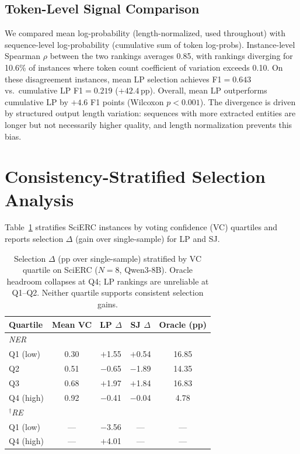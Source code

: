 \subsection{Token-Level Signal Comparison}\label{app:token_signal}

We compared mean log-probability (length-normalized, used throughout) with sequence-level log-probability (cumulative sum of token log-probs).
Instance-level Spearman $\rho$ between the two rankings averages 0.85, with rankings diverging for 10.6\% of instances where token count coefficient of variation exceeds 0.10.
On these disagreement instances, mean LP selection achieves F1${=}0.643$ vs.\ cumulative LP F1${=}0.219$ ($+42.4$\,pp).
Overall, mean LP outperforms cumulative LP by $+4.6$ F1 points (Wilcoxon $p{<}0.001$).
The divergence is driven by structured output length variation: sequences with more extracted entities are longer but not necessarily higher quality, and length normalization prevents this bias.

\section{Consistency-Stratified Selection Analysis}\label{app:vc_quartile}

Table~\ref{tab:vc_quartile} stratifies SciERC instances by voting confidence (VC) quartiles and reports selection $\Delta$ (gain over single-sample) for LP and SJ.

\begin{table}[t]
\centering
\small
\caption{Selection $\Delta$ (pp over single-sample) stratified by VC quartile on SciERC ($N{=}8$, Qwen3-8B). Oracle headroom collapses at Q4; LP rankings are unreliable at Q1--Q2. Neither quartile supports consistent selection gains.}
\label{tab:vc_quartile}
\begin{tabular}{lcccc}
\toprule
Quartile & Mean VC & LP $\Delta$ & SJ $\Delta$ & Oracle (pp) \\
\midrule
\multicolumn{5}{l}{\textit{NER}} \\
Q1 (low) & 0.30 & $+$1.55 & $+$0.54 & 16.85 \\
Q2 & 0.51 & $-$0.65 & $-$1.89 & 14.35 \\
Q3 & 0.68 & $+$1.97 & $+$1.84 & 16.83 \\
Q4 (high) & 0.92 & $-$0.41 & $-$0.04 & 4.78 \\
\midrule
\multicolumn{5}{l}{\textit{$^\dagger$RE}} \\
Q1 (low) & --- & $-$3.56 & --- & --- \\
Q4 (high) & --- & $+$4.01 & --- & --- \\
\bottomrule
\end{tabular}
\end{table}

